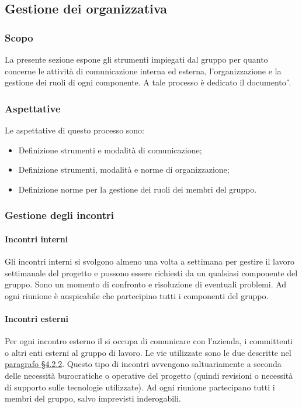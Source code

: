 \subsection{Gestione dei organizzativa} %
\subsubsection{Scopo}
La presente sezione espone gli strumenti impiegati dal gruppo \teamname{} per quanto concerne le attività di comunicazione interna ed esterna, l'organizzazione e la gestione dei ruoli di ogni componente.
A tale processo è dedicato il documento \PdP{}\textit{\G}.

\subsubsection{Aspettative}
Le aspettative di questo processo sono:
\begin{itemize}
	\item Definizione strumenti e modalità di comunicazione;
	\item Definizione strumenti, modalità e norme di organizzazione;
	\item Definizione norme per la gestione dei ruoli dei membri del gruppo.
\end{itemize}


		
\subsubsection{Gestione degli incontri}
	\paragraph{Incontri interni}
	Gli incontri interni si svolgono almeno una volta a settimana per gestire il lavoro settimanale del progetto e possono essere richiesti da un qualsiasi componente del gruppo. Sono un momento di confronto e risoluzione di eventuali problemi. Ad ogni riunione è auspicabile che partecipino tutti i componenti del gruppo.
	\paragraph{Incontri esterni}
	Per ogni incontro esterno il \RdP{} si occupa di comunicare con l'azienda, i committenti o altri enti esterni al gruppo di lavoro. 
	Le vie utilizzate sono le due descritte nel \hyperref[sec:Comunicazioni esterne]{paragrafo \S4.2.2}.
	Questo tipo di incontri avvengono saltuariamente a seconda delle necessità burocratiche o operative del progetto (quindi revisioni o necessità di supporto sulle tecnologie utilizzate).
	Ad ogni riunione partecipano tutti i membri del gruppo, salvo imprevisti inderogabili.
